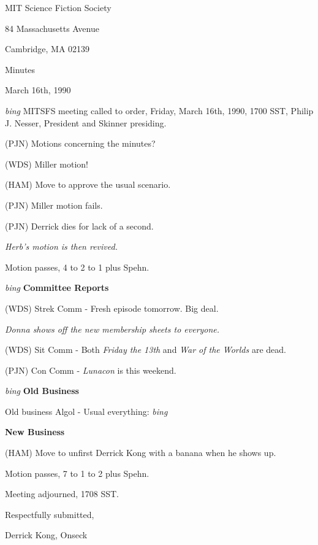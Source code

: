 \setlength{\topmargin}{-0.5in}
\setlength{\oddsidemargin}{0.0in}
\setlength{\evensidemargin}{0.0in}
\setlength{\textheight}{9in}
\setlength{\textwidth}{6.5in}



\begin{center}
MIT Science Fiction Society

84 Massachusetts Avenue

Cambridge, MA 02139

\vspace{0.2in}
Minutes

March 16th, 1990

\end{center}
 
\vspace{0.15in}
{\em bing\/}  MITSFS meeting called to order, Friday, March 16th, 1990,
1700 SST, Philip J. Nesser, President and Skinner presiding.

(PJN) Motions concerning the minutes?

(WDS) Miller motion!

(HAM) Move to approve the usual scenario.

(PJN) Miller motion fails.

(PJN) Derrick dies for lack of a second.

{\em Herb's motion is then revived.}

Motion passes, 4 to 2 to 1 plus Spehn.

\vspace{0.15in}
{\em bing\/} {\bf Committee Reports}

(WDS) Strek Comm - Fresh episode tomorrow.  Big deal.

{\em Donna shows off the new membership sheets to everyone.}

(WDS) Sit Comm - Both {\em Friday the 13th} and {\em War of the
Worlds} are dead.

(PJN) Con Comm - {\em Lunacon} is this weekend.

\vspace{0.15in}
{\em bing\/} {\bf Old Business}

Old business Algol - Usual everything: {\em bing\/}

\vspace{0.15in}
{\bf New Business}

(HAM) Move to unfirst Derrick Kong with a banana when he shows up.

Motion passes, 7 to 1 to 2 plus Spehn.

Meeting adjourned, 1708 SST.

\vspace{0.15in}
\begin{center}
Respectfully submitted,

Derrick Kong, Onseck
\end{center}

